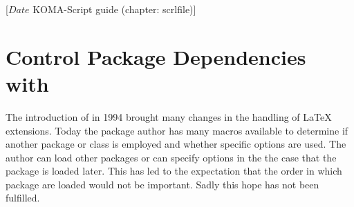 %
%
%
%
%
%
%
%
% 
%
%
%
%

                 [$Date$
                  KOMA-Script guide (chapter: scrlfile)]


\chapter{Control Package Dependencies with }
\BeginIndexGroup
{}

The introduction of {\LaTeXe} in 1994 brought many changes in the
handling of {\LaTeX} extensions.  Today the package author has many
macros available to determine if another package or class is
employed and whether specific options are used.  The author can load
other packages or can specify options in the the case that the
package is loaded later.  This has led to the expectation that the
order in which package are loaded would not be important.  Sadly
this hope has not been fulfilled.

